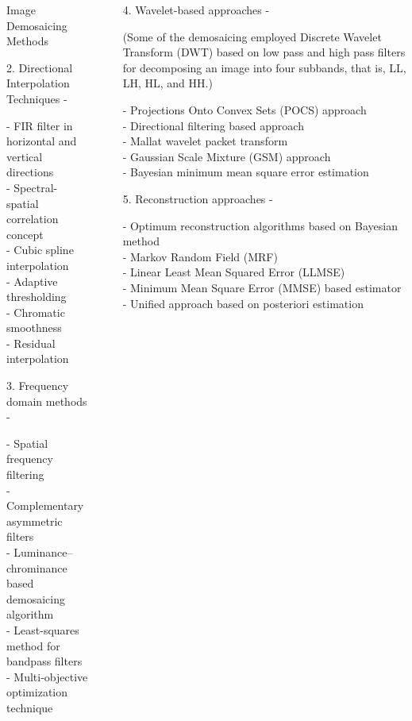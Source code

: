 \documentclass[final]{beamer}
\newlength{\sepwidth}
\newlength{\colwidth}
\newcommand{\separatorcolumn}{\begin{column}{\sepwidth}\end{column}}
\begin{document}
\begin{frame}[t]
\begin{columns}[t]
\begin{column}{\colwidth}
\begin{block}{Image Demosaicing Methods}
\par 2. Directional Interpolation Techniques - 

\par - FIR filter in horizontal and vertical directions \\ - Spectral-spatial
correlation concept \\ - Cubic spline interpolation \\ - Adaptive thresholding \\ - Chromatic smoothness \\ -  Residual interpolation 

\par 3. Frequency domain methods -
\par - Spatial frequency filtering \\ - Complementary asymmetric filters \\ - Luminance–chrominance based demosaicing algorithm \\ -  Least-squares method for
bandpass filters \\ - Multi-objective optimization technique



\end{block}

\end{column}

\separatorcolumn

\begin{column}{\colwidth}
  
  
\par 4. Wavelet-based approaches - 
\par (Some of the demosaicing employed Discrete Wavelet Transform (DWT) based on low pass and high pass filters for decomposing an image into four subbands, that is, LL, LH, HL, and HH.)
\par - Projections Onto Convex Sets (POCS) approach  \\ - Directional
filtering based approach \\ - Mallat wavelet packet transform \\ -  Gaussian Scale Mixture (GSM) approach \\ - Bayesian minimum mean square error estimation

\par 5. Reconstruction approaches - 

\par - Optimum reconstruction algorithms based on Bayesian method \\ -  Markov Random Field (MRF) \\ - Linear Least Mean Squared Error (LLMSE) \\ - Minimum Mean Square Error (MMSE) based estimator \\ - Unified approach based on posteriori estimation


\end{column}
\end{columns}
\end{frame}
\end{document}
